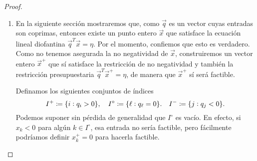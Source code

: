\begin{proof} \hfill
	\begin{enumerate}
		\item
			En la siguiente sección mostraremos que, como $\vec{q}$ es un vector cuyas entradas son
			coprimas, entonces existe un punto entero $\vec{x}$ que satisface la ecuación lineal
			diofantina $\vec{q}^T\vec{x} = \eta$. Por el momento, confiemos que esto es verdadero.
			Como no tenemos asegurada la no negatividad de $\vec{x}$, construiremos un vector entero
			$\vec{x}^+$ que sí satisface la restricción de no negatividad y también la restricción
			presupuestaria $\vec{q}^T\vec{x}^+ = \eta$, de manera que $\vec{x}^+$ sí será factible.

			Definamos los siguientes conjuntos de índices
			\begin{equation*}
				I^+ \coloneq \lbrace i \vcentcolon q_i > 0 \rbrace,
				\quad I^\circ \coloneq \lbrace \ell \vcentcolon q_\ell = 0 \rbrace.
				\quad I^- \coloneq \lbrace j \vcentcolon q_j < 0 \rbrace.
			\end{equation*}
			Podemos suponer sin pérdida de generalidad que $I^\circ$ es vacío. En efecto, si $x_k
			< 0$ para algún $k \in I^\circ$, esa entrada no sería factible, pero fácilmente
			podríamos definir $x_k^+ = 0$ para hacerla factible.


\end{enumerate}
\end{proof}
